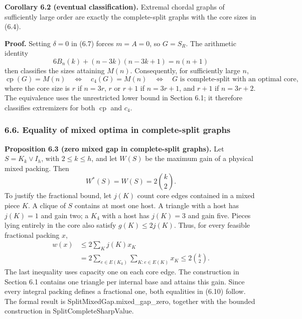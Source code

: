 \documentclass[english,11pt,a4paper]{article}
\begin{document}
\textbf{Corollary 6.2 (eventual classification).} Extremal chordal graphs of sufficiently large order are exactly the complete-split graphs with the core sizes in (6.4).

\textbf{Proof.} Setting \(\delta=0\) in (6.7) forces \(m=A=0\), so \(G=S_R\). The arithmetic identity \[
6B_n(k)+(n-3k)(n-3k+1)=n(n+1)
\tag{6.8}
\] then classifies the sizes attaining \(M(n)\). Consequently, for sufficiently large \(n\), \[
\operatorname{cp}(G)=M(n)
\quad\Longleftrightarrow\quad
c_4(G)=M(n)
\quad\Longleftrightarrow\quad
G\text{ is complete-split with an optimal core},
\tag{6.9}
\] where the core size is \(r\) if \(n=3r\), \(r\) or \(r+1\) if \(n=3r+1\), and \(r+1\) if \(n=3r+2\). The equivalence uses the unrestricted lower bound in Section 6.1; it therefore classifies extremizers for both \(\operatorname{cp}\) and \(c_4\).


\subsubsection{6.6. Equality of mixed optima in complete-split graphs}\label{equality-of-mixed-optima-in-complete-split-graphs}


\textbf{Proposition 6.3 (zero mixed gap in complete-split graphs).} Let \(S=K_k\vee I_h\), with \(2\le k\le h\), and let \(W(S)\) be the maximum gain of a physical mixed packing. Then \[
W^*(S)=W(S)=2\binom k2.
\tag{6.10}
\] To justify the fractional bound, let \(j(K)\) count core edges contained in a mixed piece \(K\). A clique of \(S\) contains at most one host. A triangle with a host has \(j(K)=1\) and gain two; a \(K_4\) with a host has \(j(K)=3\) and gain five. Pieces lying entirely in the core also satisfy \(g(K)\le2j(K)\). Thus, for every feasible fractional packing \(x\), \[
\begin{aligned}
w(x)&\le2\sum_K j(K)x_K\\
&=2\sum_{e\in E(K_k)}\sum_{K:e\in E(K)}x_K
\le2\binom k2.
\end{aligned}
\tag{6.11}
\] The last inequality uses capacity one on each core edge. The construction in Section 6.1 contains one triangle per internal base and attains this gain. Since every integral packing defines a fractional one, both equalities in (6.10) follow. The formal result is {\ttfamily\small SplitMixedGa\discretionary{\hbox{\ensuremath{\hookrightarrow}}}{}{}p.\discretionary{\hbox{\ensuremath{\hookrightarrow}}}{}{}mixed\_\discretionary{\hbox{\ensuremath{\hookrightarrow}}}{}{}gap\_\discretionary{\hbox{\ensuremath{\hookrightarrow}}}{}{}zero}, together with the bounded construction in {\ttfamily\small SplitComplet\discretionary{\hbox{\ensuremath{\hookrightarrow}}}{}{}eSharpValue}.
\end{document}
